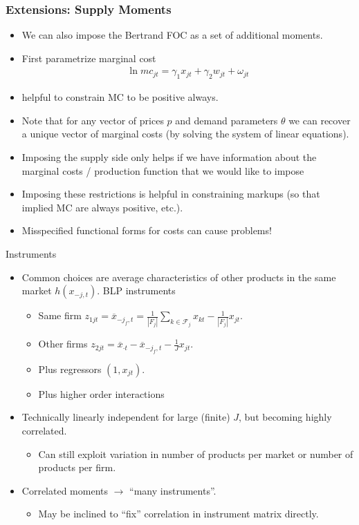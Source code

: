 \documentclass[xcolor=pdftex,dvipsnames,table,mathserif,aspectratio=169]{beamer}
\begin{document}
\begin{frame} \frametitle{Extensions: Supply Moments}
\begin{itemize}
\item We can also impose the Bertrand FOC as a set of additional moments.
\item First parametrize marginal cost
\begin{eqnarray*}
\ln mc_{jt} = \gamma_1 x_{jt} + \gamma_2 w_{jt} + \omega_{jt}
\end{eqnarray*}
\item helpful to constrain MC to be positive always.
\item Note that for any vector of prices $p$ and demand parameters $\theta$ we can recover a unique vector of marginal costs (by solving the system of linear equations).
\item Imposing the supply side only helps if we have information about the marginal costs / production function that we would like to impose
\item Imposing these restrictions is helpful in constraining markups (so that implied MC are always positive, etc.).
\item Misspecified functional forms for costs can cause problems!
\end{itemize}
\end{frame}


\begin{frame}{Instruments}
\begin{itemize}
\item Common choices are average characteristics of other products in the same market $h(x_{-j,t})$. \alert{BLP instruments}
\begin{itemize}
\item Same firm $z_{1jt} = \overline{x}_{-j_f,t} = \frac{1}{\left\vert{F_j}\right\vert}  \sum_{k \in \mathcal{F}_j} x_{kt} - \frac{1}{\left\vert{F_j}\right\vert} x_{jt}$.
\item Other firms $z_{2jt}=\overline{x}_{\cdot t} - \overline{x}_{-j_f,t} - \frac{1}{J} x_{jt}$.
\item Plus regressors $(1, x_{jt})$.
\item Plus higher order interactions 
\end{itemize}
\item Technically linearly independent for large (finite) $J$, but becoming highly correlated.
\begin{itemize}
\item Can still exploit variation in number of products per market or number of products per firm.
\end{itemize}
\item Correlated moments $\rightarrow$ ``many instruments''.
\begin{itemize}
\item May be inclined to ``fix'' correlation in instrument matrix directly.
\end{itemize}
\end{itemize}
\end{frame}
\end{document}
